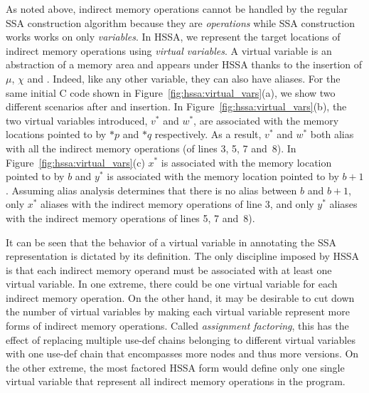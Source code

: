 As noted above, indirect memory operations cannot be handled by the regular SSA construction algorithm because they are {\em operations} while SSA construction works works on only {\em variables}.
In HSSA, we represent the target locations of indirect memory operations using {\em virtual variables}. A virtual variable is an abstraction of a memory area and appears under HSSA thanks to the insertion of $\mu$, $\chi$ and \phifuns.
Indeed, like any other variable, they can also have aliases. 
For the same initial C code shown in Figure~\ref{fig:hssa:virtual_vars}(a),
we show two different scenarios after \mufun and \chifun insertion. 
In Figure~\ref{fig:hssa:virtual_vars}(b), the two virtual variables introduced,
$v^*$ and $w^*$, are associated with the memory locations pointed to by $*p$ and $*q$ respectively.
As a result,
$v^*$ and $w^*$ both alias with all the indirect memory operations (of lines 3, 5, 7 and~8). 
In Figure~\ref{fig:hssa:virtual_vars}(c) $x^*$ is associated with the memory
location pointed to by $b$ and $y^*$ is associated with the memory location
pointed to by $b+1$. Assuming alias analysis determines that there is no alias
between $b$ and $b+1$,
only $x^*$ aliases with the indirect memory operations of line 3,
and only $y^*$ aliases with the indirect memory operations of lines 5, 7 and~8).

It can be seen that the behavior of a virtual variable in annotating the SSA
representation is dictated by its definition.
The only discipline imposed by HSSA is that each indirect memory operand must be associated with at least one virtual variable. 
In one extreme, there could be one virtual variable for each indirect memory operation. 
On the other hand, it may be desirable to cut down the number of virtual 
variables by making each virtual variable represent more forms of indirect
memory operations.  Called \emph{assignment factoring}, this has the effect of
replacing multiple use-def chains belonging to different virtual variables
with one use-def chain that encompasses more nodes and thus more versions.
On the other extreme, the most factored HSSA form would define only one single virtual variable that represent all indirect memory operations in the program.

